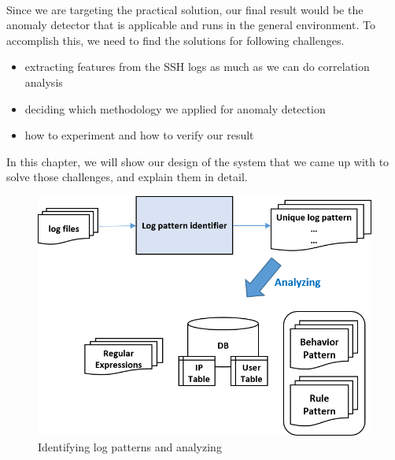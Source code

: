 \documentclass [11pt]{article}
\begin{document}
\paragraph{} 
Since we are targeting the practical solution, our final result would be the anomaly detector that is applicable and runs in the general environment. To accomplish this, we need to find the solutions for following challenges.
\begin{itemize}
\item extracting features from the SSH logs as much as we can do correlation analysis
\item deciding which methodology we applied for anomaly detection
\item how to experiment and how to verify our result
\end{itemize}
In this chapter, we will show our design of the system that we came up with to solve those challenges, and explain them in detail. 

\begin{figure}[b!]
\centering
\includegraphics[scale=0.7]{./figures/structure_1.png}
\caption{Identifying log patterns and analyzing}
\label{fig:structure_1}
\end{figure}
\end{document}
